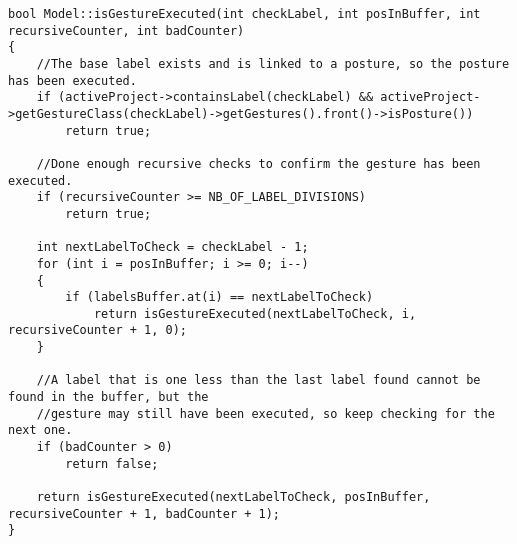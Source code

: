 \begin{lstlisting}
bool Model::isGestureExecuted(int checkLabel, int posInBuffer, int recursiveCounter, int badCounter)
{
	//The base label exists and is linked to a posture, so the posture has been executed.
	if (activeProject->containsLabel(checkLabel) && activeProject->getGestureClass(checkLabel)->getGestures().front()->isPosture())
		return true;

	//Done enough recursive checks to confirm the gesture has been executed.
	if (recursiveCounter >= NB_OF_LABEL_DIVISIONS)
		return true;

	int nextLabelToCheck = checkLabel - 1;
	for (int i = posInBuffer; i >= 0; i--)
	{
		if (labelsBuffer.at(i) == nextLabelToCheck)
			return isGestureExecuted(nextLabelToCheck, i, recursiveCounter + 1, 0);
	}

	//A label that is one less than the last label found cannot be found in the buffer, but the
	//gesture may still have been executed, so keep checking for the next one.
	if (badCounter > 0)
		return false;
		
	return isGestureExecuted(nextLabelToCheck, posInBuffer, recursiveCounter + 1, badCounter + 1);
}
\end{lstlisting}